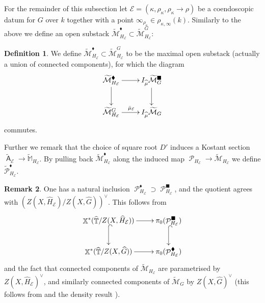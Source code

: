 \documentclass{article}
\DeclareMathOperator{\A}{\mathsf{A}}
\newcommand{\Ec}{\mathcal{E}}
\DeclareMathOperator{\Xb}{\mathbb{X}}
\DeclareMathOperator{\Tb}{\mathbb{T}}
\newcommand{\Mc}{\mathcal{M}}
\DeclareMathOperator{\Pc}{\mathcal{P}}
\newcommand{\BM}{{\mathbb{M}}}
\newcommand{\CE}{{\mathcal E}}
\newcommand{\CM}{{\mathcal M}}
\newcommand{\wpc}{\widetilde{\mathcal{P}} }
\newcommand{\wmc}{\widetilde{\Mc} }
\theoremstyle{definition}
\newtheorem{definition}{Definition}[section]
\newtheorem{rmk}[definition]{Remark}
\theoremstyle{plain}
\begin{document}
For the remainder of this subsection let $\CE=(\kappa,\rho_\kappa,\rho_\kappa \to \rho)$ be a coendoscopic datum for $G$ over $k$ together with a point $\infty_{\rho_{\kappa}} \in \rho_{\kappa,\infty}(k)$. Similarly to the above we define an open substack $\wmc_{H_{\Ec}}^\blacklozenge \subset \wmc^{G}_{H_{\Ec}}$: 

\begin{definition}
 We define $\wmc_{H_{\Ec}}^\blacklozenge \subset \wmc^{G}_{H_{\Ec}}$ to be the maximal open substack (actually a union of connected components), for which the diagram
\[
\xymatrix{
 \wmc_{H_{\Ec}}^\blacklozenge \ar[r] \ar[d] & I_{\widehat{\mu}}\widetilde{\Mc}_G^{\blacksquare} \ar[d] \\
 \wmc_{H_{\Ec}}^G \ar[r]^{\bar{\mu}_\CE} & I_{\widehat{\mu}}\widetilde{\Mc}_G
}
\]
commutes.
\end{definition}

Further we remark that the choice of square root $D'$ induces a Kostant section $\widetilde{\A}_\CE \to \widetilde{\BM}_{H_\CE}$. By pulling back  $\wmc_{H_{\Ec}}^{\blacklozenge}$ along the induced map $\Pc_{H_{\Ec}} \to \wmc_{H_{\Ec}}$ we define $\wpc_{H_{\Ec}}^{\blacklozenge}$.

\begin{rmk}\label{remarky}
One has a natural inclusion $\Pc_{H_{\Ec}}^{\blacklozenge} \supset \Pc_{H_{\Ec}}^{\blacksquare}$, and the quotient agrees with $(Z(X,\widehat{H}_{\Ec})/Z(X,\widehat{G}))^{\vee}$. This follows from
\[
\xymatrix{
\Xb^*(\widehat{\Tb}/Z(X,\widehat{H}_{\Ec})) \ar[r] \ar@{^(->}[d] & \pi_0(\Pc_{H_{\Ec}}^{\blacksquare}) \ar@{^(->}[d] \\
\Xb^*(\widehat{\Tb}/Z(X,\widehat{G})) \ar[r] & \pi_0(\Pc_{H_{\Ec}}^{\blacklozenge}) 
}
\]
and the fact that connected components of $\widetilde{\Mc}_{H_{\Ec}}$ are parametrised by $Z(X,\widehat{H}_{\Ec})^{\vee}$, and similarly connected components of $\widetilde{\Mc}_G$ by $Z(X,\widehat{G})^{\vee}$ (this follows from \cite[Corollaire 4.10.4]{MR2653248} and the density result \cite[Proposition 4.16.1]{MR2653248}).
\end{rmk}

\end{document}
